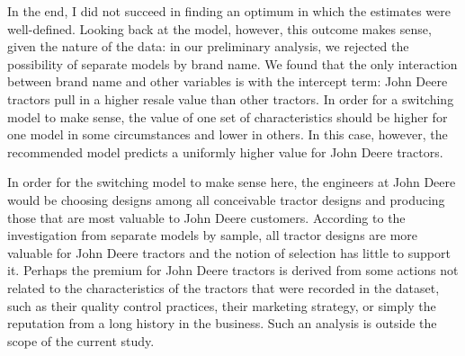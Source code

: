 In the end, I did not succeed in finding an optimum in which the estimates were well-defined. 
Looking back at the model, however, this outcome makes sense, 
given the nature of the data: in our preliminary analysis, 
we rejected the possibility of separate models by brand name. 
We found that the only interaction between brand name and other variables is with the intercept term:
John Deere tractors pull in a higher resale value than other tractors. 
In order for a switching model to make sense, the value of one set of characteristics should be higher for one model in some circumstances and lower in others. 
In this case, however, the recommended model predicts a uniformly higher value 
for John Deere tractors. 

In order for the switching model to make sense here, the engineers at John Deere would be choosing designs among all conceivable tractor designs
and producing those that are most valuable to John Deere customers. 
According to the investigation from separate models by sample, 
all tractor designs are more valuable for John Deere tractors and 
the notion of selection has little to support it. 
Perhaps the premium for John Deere tractors is derived from some
actions not related to the characteristics of the tractors that were recorded in the dataset, such as their quality control practices, their marketing strategy, 
or simply the reputation from a long history in the business. 
Such an analysis is outside the scope of the current study. 



% 
